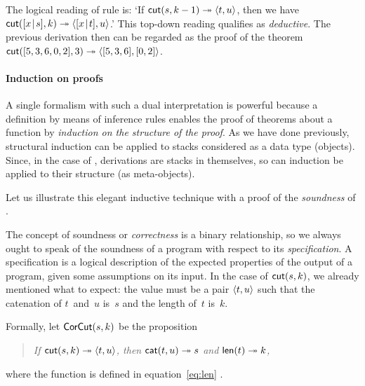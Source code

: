 The logical reading of rule  is: `If \(\textsf{cut}(s,k-1)
\twoheadrightarrow \langle{t},{u}\rangle\), then we have
\(\textsf{cut}([{x}\!\mid\!{s}],k) \twoheadrightarrow
\langle{[{x}\!\mid\!{t}]},{u}\rangle\).'  This top\hyp{}down reading qualifies as
\emph{deductive}. The
previous derivation then can be regarded as the proof of the theorem
\(\textsf{cut}([5,3,6,0,2],3) \twoheadrightarrow \langle{[5,3,6]},{[0,2]}\rangle\).


\paragraph{Induction on proofs}

A single formalism with such a dual interpretation is powerful because
a definition by means of inference rules enables the proof of theorems
about a function by \emph{induction on the structure of the proof}. As
we have done previously, structural induction can be applied to stacks
considered as a data type (objects). Since, in the case of
, derivations are stacks in themselves, so can induction be
applied to their structure (as meta\hyp{}objects). 

Let us illustrate this elegant inductive technique with a proof of the
\emph{soundness} of
.

\label{par:cut_sound}

The concept of soundness or \emph{correctness} \citep{McCarthy_1962,
  Floyd_1967, Hoare_1971,
  Dijkstra_1976} is a binary
relationship, so we always ought to speak of the soundness of a
program with respect to its
\emph{specification}. A specification is a
logical description of the expected properties of the output of a
program, given some assumptions on its input. In the case of
\(\textsf{cut}(s,k)\), we already mentioned what to expect: the value
must be a pair \(\langle{t},{u}\rangle\) such that the catenation of
\(t\)~and~\(u\) is~\(s\) and the length of~\(t\) is~\(k\).

Formally, let \(\textsf{CorCut}({s,k})\)
be the proposition
\begin{quote}
  \textsl{If \(\textsf{cut}(s,k) \twoheadrightarrow \langle{t},{u}\rangle\), then
    \(\textsf{cat}(t,u) \twoheadrightarrow s\) and \(\textsf{len}(t)
    \twoheadrightarrow k\),}
\end{quote}
where the function  is defined in
equation~\eqref{eq:len} .


